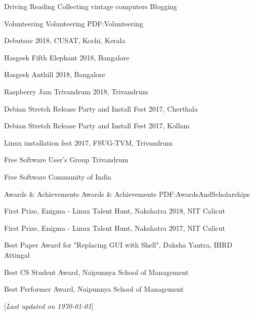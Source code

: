 \documentclass[letterpaper,MMMyyyy,nonstopmode]{simpleresumecv}
\newcommand{\CVNote}{Last updated on {\today}}
\begin{document}
\begin{Body}
\Entry
Driving \textbullet{} Reading \textbullet{} Collecting vintage computers
\textbullet{} Blogging


\BigGap
\Section
{Volunteering}
{Volunteering}
{PDF:Volunteering}

\BulletItem
Debutsav 2018, CUSAT, Kochi, Kerala

\BigGap
\BulletItem
Hasgeek Fifth Elephant 2018, Bangalore

\BigGap
\BulletItem
Hasgeek Anthill 2018, Bangalore 

\BigGap
\BulletItem
Raspberry Jam Trivandrum 2018, Trivandrum

\BigGap
\BulletItem
Debian Stretch Release Party and Install Fest 2017, Cherthala

\BigGap
\BulletItem
Debian Stretch Release Party and Install Fest 2017, Kollam

\BigGap
\BulletItem
Linux installation fest 2017, FSUG-TVM, Trivandrum

\BigGap
\BulletItem
Free Software User's Group Trivandrum

\BigGap
\BulletItem
Free Software Community of India


\BigGap
\Section
{Awards \&\newline
Achievements}
{Awards \& Achievements}
{PDF:AwardsAndScholarships}

\BulletItem
First Prize, Enigma - Linux Talent Hunt,
Nakshatra 2018, NIT Calicut
\hfill
{}

\BigGap
\BulletItem
First Prize, Enigma - Linux Talent Hunt,
Nakshatra 2017, NIT Calicut
\hfill
{}

\BigGap
\BulletItem
Best Paper Award for "Replacing GUI with Shell",
Daksha Yantra, IHRD Attingal
\hfill
{}

\BigGap
\BulletItem
Best CS Student Award,
Naipunnya School of Management
\hfill
{}

\BigGap
\BulletItem
Best Performer Award,
Naipunnya School of Management
\hfill
{}


\end{Body}


\BigGap
\UseNoteFont%
\null\hfill%
[\textit{\CVNote}]
\end{document}
